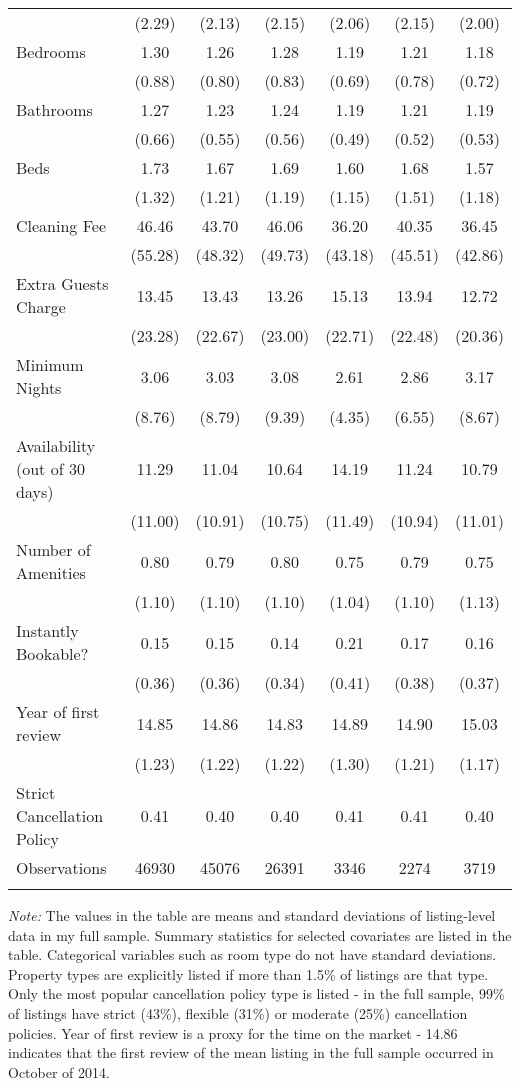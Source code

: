 \begin{table}[htbp]
\begin{center}
\begin{tabular}{l c | c | c c c c}
 & (2.29) & (2.13) & (2.15) & (2.06) & (2.15) & (2.00) \\
 Bedrooms & 1.30 & 1.26 & 1.28 & 1.19 & 1.21 & 1.18 \\
 & (0.88) & (0.80) & (0.83) & (0.69) & (0.78) & (0.72) \\
 Bathrooms & 1.27 & 1.23 & 1.24 & 1.19 & 1.21 & 1.19 \\
 & (0.66) & (0.55) & (0.56) & (0.49) & (0.52) & (0.53) \\
 Beds & 1.73 & 1.67 & 1.69 & 1.60 & 1.68 & 1.57 \\
 & (1.32) & (1.21) & (1.19) & (1.15) & (1.51) & (1.18) \\
 Cleaning Fee & 46.46 & 43.70 & 46.06 & 36.20 & 40.35 & 36.45 \\
 & (55.28) & (48.32) & (49.73) & (43.18) & (45.51) & (42.86) \\
 Extra Guests Charge & 13.45 & 13.43 & 13.26 & 15.13 & 13.94 & 12.72 \\
 & (23.28) & (22.67) & (23.00) & (22.71) & (22.48) & (20.36) \\
 Minimum Nights & 3.06 & 3.03 & 3.08 & 2.61 & 2.86 & 3.17 \\
 & (8.76) & (8.79) & (9.39) & (4.35) & (6.55) & (8.67) \\
 Availability (out of 30 days) & 11.29 & 11.04 & 10.64 & 14.19 & 11.24 & 10.79 \\
 & (11.00) & (10.91) & (10.75) & (11.49) & (10.94) & (11.01) \\
 Number of Amenities & 0.80 & 0.79 & 0.80 & 0.75 & 0.79 & 0.75 \\
 & (1.10) & (1.10) & (1.10) & (1.04) & (1.10) & (1.13) \\
 Instantly Bookable? & 0.15 & 0.15 & 0.14 & 0.21 & 0.17 & 0.16 \\
 & (0.36) & (0.36) & (0.34) & (0.41) & (0.38) & (0.37) \\
 Year of first review & 14.85 & 14.86 & 14.83 & 14.89 & 14.90 & 15.03 \\
 & (1.23) & (1.22) & (1.22) & (1.30) & (1.21) & (1.17) \\
 Strict Cancellation Policy & 0.41 & 0.40 & 0.40 & 0.41 & 0.41 & 0.40 \\\hline
Observations & 46930 & 45076 & 26391 & 3346 & 2274 & 3719
\\
\hline\hline\noalign{\smallskip} \end{tabular} 
\begin{minipage}{6in}
{\it Note:} The values in the table are means and standard deviations of listing-level data in my full sample. Summary statistics for selected covariates are listed in the table. Categorical variables such as room type do not have standard deviations. Property types are explicitly listed if more than 1.5\% of listings are that type. Only the most popular cancellation policy type is listed - in the full sample, 99\% of listings have strict (43\%), flexible (31\%) or moderate (25\%) cancellation policies. Year of first review is a proxy for the time on the market - 14.86 indicates that the first review of the mean listing in the full sample occurred in October of 2014.

\end{minipage}
\end{center}
\end{table}
